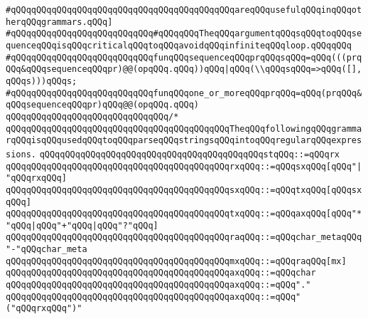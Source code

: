 \verb|#qQQqqQQqqQQqqQQqqQQqqQQqqQQqqQQqqQQqqQQqqQQqareqQQqusefulqQQqinqQQqotherqQQqgrammars.qQQq]|\newline
\verb|#qQQqqQQqqQQqqQQqqQQqqQQqqQQq#qQQqqQQqTheqQQqargumentqQQqsqQQqtoqQQqsequenceqQQqisqQQqcriticalqQQqtoqQQqavoidqQQqinfiniteqQQqloop.qQQqqQQq|\newline
\verb|#qQQqqQQqqQQqqQQqqQQqqQQqqQQqfunqQQqsequenceqQQqprqQQqsqQQq=qQQq(((prqQQq&qQQqsequenceqQQqpr)@@(opqQQq.qQQq))qQQq|\verb#|qQQq(\\qQQqsqQQq=>qQQq([],qQQqs)))qQQqs;#\newline
\verb|#qQQqqQQqqQQqqQQqqQQqqQQqqQQqfunqQQqone_or_moreqQQqprqQQq=qQQq(prqQQq&qQQqsequenceqQQqpr)qQQq@@(opqQQq.qQQq)|\newline
\newline
\newline
\verb|qQQqqQQqqQQqqQQqqQQqqQQqqQQqqQQq/*|\newline
\verb|qQQqqQQqqQQqqQQqqQQqqQQqqQQqqQQqqQQqqQQqqQQqTheqQQqfollowingqQQqgrammarqQQqisqQQqusedqQQqtoqQQqparseqQQqstringsqQQqintoqQQqregularqQQqexpressions.|\newline
\newline
\verb|qQQqqQQqqQQqqQQqqQQqqQQqqQQqqQQqqQQqqQQqqQQqstqQQq::=qQQqrx|\newline
\newline
\verb|qQQqqQQqqQQqqQQqqQQqqQQqqQQqqQQqqQQqqQQqqQQqrxqQQq::=qQQqsxqQQq[qQQq"|\verb#|"qQQqrxqQQq]#\newline
\newline
\verb|qQQqqQQqqQQqqQQqqQQqqQQqqQQqqQQqqQQqqQQqqQQqsxqQQq::=qQQqtxqQQq[qQQqsxqQQq]|\newline
\newline
\verb|qQQqqQQqqQQqqQQqqQQqqQQqqQQqqQQqqQQqqQQqqQQqtxqQQq::=qQQqaxqQQq[qQQq"*"qQQq|\verb#|qQQq"+"qQQq|qQQq"?"qQQq]#\newline
\newline
\verb|qQQqqQQqqQQqqQQqqQQqqQQqqQQqqQQqqQQqqQQqqQQqraqQQq::=qQQqchar_metaqQQq"-"qQQqchar_meta|\newline
\verb|qQQqqQQqqQQqqQQqqQQqqQQqqQQqqQQqqQQqqQQqqQQqmxqQQq::=qQQqraqQQq[mx]|\newline
\newline
\verb|qQQqqQQqqQQqqQQqqQQqqQQqqQQqqQQqqQQqqQQqqQQqaxqQQq::=qQQqchar|\newline
\verb|qQQqqQQqqQQqqQQqqQQqqQQqqQQqqQQqqQQqqQQqqQQqaxqQQq::=qQQq"."|\newline
\verb|qQQqqQQqqQQqqQQqqQQqqQQqqQQqqQQqqQQqqQQqqQQqaxqQQq::=qQQq"("qQQqrxqQQq")"|\newline

